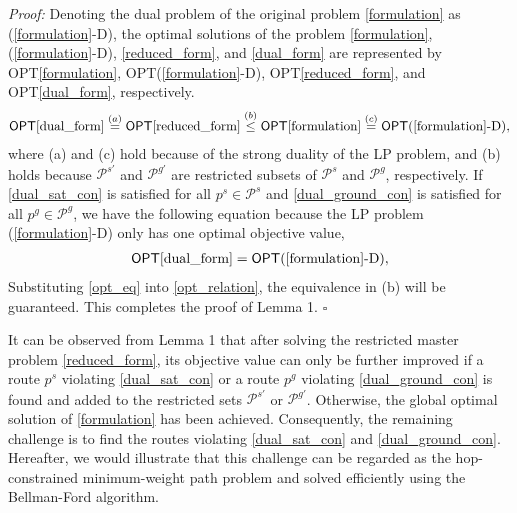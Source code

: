 \documentclass[journal,10pt]{IEEEtran}
\begin{document}
\textit{Proof:} Denoting the dual problem of the original problem \eqref{formulation} as (\ref{formulation}-D), the optimal solutions of the problem \eqref{formulation}, (\ref{formulation}-D), \eqref{reduced_form}, and \eqref{dual_form} are represented by {\textsf{OPT}}\eqref{formulation}, {\textsf{OPT}}(\ref{formulation}-D), {\textsf{OPT}}\eqref{reduced_form}, and {\textsf{OPT}}\eqref{dual_form}, respectively. 
\begin{align}
\label{opt_relation}
{\textsf{OPT}}\eqref{dual_form} \overset{(a)}{=} {\textsf{OPT}}\eqref{reduced_form} \overset{(b)}{\leq} {\textsf{OPT}}\eqref{formulation} \overset{(c)}{=} {\textsf{OPT}}(\ref{formulation}\textrm{-D}), 
\end{align} 
where (a) and (c) hold because of the strong duality of the LP problem, and (b) holds because $\mathcal{P}^{s'}$ and $\mathcal{P}^{g'}$ are restricted subsets of $\mathcal{P}^{s}$ and $\mathcal{P}^{g}$, respectively. If \eqref{dual_sat_con} is satisfied for all $p^s \!\in \! \mathcal{P}^s$ and \eqref{dual_ground_con} is satisfied for all $p^g \!\in \! \mathcal{P}^g$, we have the following equation because the LP problem (\ref{formulation}\textrm{-D}) only has one optimal objective value,
\begin{align}
\label{opt_eq}
{\textsf{OPT}}\eqref{dual_form} = {\textsf{OPT}}(\ref{formulation}\textrm{-D}), 
\end{align} 
Substituting \eqref{opt_eq} into \eqref{opt_relation}, the equivalence in (b) will be guaranteed. This completes the proof of Lemma 1. $\square$

It can be observed from Lemma 1 that after solving the restricted master problem \eqref{reduced_form}, its objective value can only be further improved if a route $p^s$ violating \eqref{dual_sat_con} or a route $p^g$ violating \eqref{dual_ground_con} is found and added to the restricted sets $\mathcal{P}^{s'}$ or $\mathcal{P}^{g'}$. Otherwise, the global optimal solution of \eqref{formulation} has been achieved. Consequently, the remaining challenge is to find the routes violating \eqref{dual_sat_con} and \eqref{dual_ground_con}. Hereafter, we would illustrate that this challenge can be regarded as the hop-constrained minimum-weight path problem and solved efficiently using the Bellman-Ford algorithm.
\end{document}
